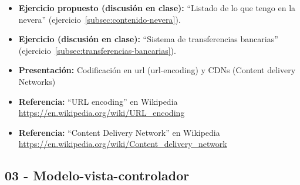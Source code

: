 \documentclass[a4paper,12pt]{article}
\begin{document}
\begin{itemize}

\item \textbf{Ejercicio propuesto (discusión en clase):} ``Listado de lo que tengo en la nevera'' (ejercicio~\ref{subsec:contenido-nevera}).
\item \textbf{Ejercicio (discusión en clase):} ``Sistema de transferencias bancarias'' (ejercicio~\ref{subsec:transferencias-bancarias}).
\item \textbf{Presentación:} Codificación en url (url-encoding) y CDNs (Content delivery Networks)
\item \textbf{Referencia:} ``URL encoding'' en Wikipedia \\ \url{https://en.wikipedia.org/wiki/URL_encoding}
\item \textbf{Referencia:} ``Content Delivery Network'' en Wikipedia \\ \url{https://en.wikipedia.org/wiki/Content_delivery_network}

\end{itemize}




\subsection{03 - Modelo-vista-controlador}
\end{document}
